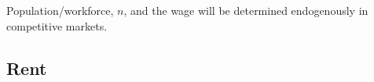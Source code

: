 
Population/workforce, $n$, and the wage will be determined endogenously in competitive markets. 


 \subsection{Rent}
\label{Sec:Rent}

